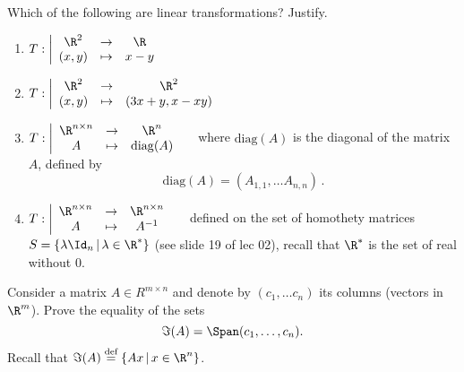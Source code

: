 \documentclass[11pt,nocut]{article}
\begin{document}
% 

\vspace{1cm}

\begin{problem}[2 points]
	Which of the following are linear transformations? Justify.
	\begin{enumerate}[label=\normalfont(\textbf{\alph*})]
		\item 
			$\displaystyle
			T: \left| 
			\begin{array}{ccc}
				\R^2 & \to & \R \\
				(x,y) & \mapsto & x-y
			\end{array}
		\right.
		$
	\item 
            $\displaystyle
            T: \left| 
            \begin{array}{ccc}
                \R^2 & \to & \R^2 \\
                (x,y) & \mapsto & (3x + y, x - xy)
            \end{array}
        \right.
        $
	\item 
			$\displaystyle
			T: \left| 
			\begin{array}{ccc}
				\R^{n \times n} & \to & \R^n \\
				A & \mapsto & \mathrm{diag}(A)
			\end{array}
		\right.\quad$ where $\mathrm{diag}(A)$ is the diagonal of the matrix $A$, defined by 
		$$\mathrm{diag}(A) = (A_{1,1}, \dots A_{n,n}) \,.$$
    \item 
        $\displaystyle
        T: \left| 
        \begin{array}{ccc}
            \R^{n \times n} & \to & \R^{n \times n}\\
            A & \mapsto & A^{-1}
        \end{array}
    \right.\quad$ defined on the set of homothety matrices $S = \{ \lambda \Id_n \, | \, \lambda \in \R^* \}$ (see slide 19 of lec 02), recall that $\R^*$ is the set of real without $0$. 
	\end{enumerate}
\end{problem}

\vspace{5mm}
\begin{problem}
	Consider a matrix $A \in R^{m \times n}$ and denote by $(c_1, \dots c_n)$ its columns (vectors in $\R^m$). Prove the equality of the sets 
	$$
	\Im(A)  = \Span(c_1, \dots, c_n).
	$$
	Recall that $\Im(A) \stackrel{\text{def}}{=}
	\{ Ax \, | \, x \in \R^n \}$.
\end{problem}
\end{document}
